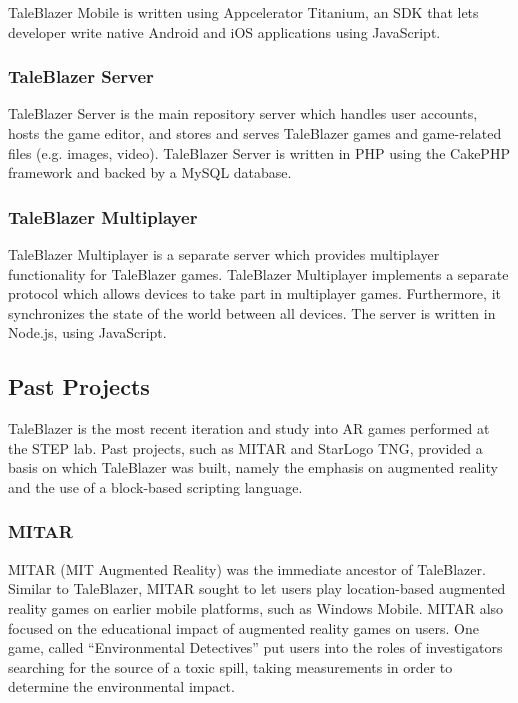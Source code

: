TaleBlazer Mobile is written using Appcelerator Titanium, an SDK that lets developer write native Android and iOS applications using JavaScript. 

\subsubsection{TaleBlazer Server}

TaleBlazer Server is the main repository server which handles user accounts, hosts the game editor, and stores and serves TaleBlazer games and game-related files (e.g. images, video). TaleBlazer Server is written in PHP using the CakePHP framework and backed by a MySQL database. 

\subsubsection{TaleBlazer Multiplayer}

TaleBlazer Multiplayer is a separate server which provides multiplayer functionality for TaleBlazer games. TaleBlazer Multiplayer implements a separate protocol which allows devices to take part in multiplayer games. Furthermore, it synchronizes the state of the world between all devices. The server is written in Node.js, using JavaScript.

\subsection{Past Projects}

TaleBlazer is the most recent iteration and study into AR games performed at the STEP lab. Past projects, such as MITAR and StarLogo TNG, provided a basis on which TaleBlazer was built, namely the emphasis on augmented reality and the use of a block-based scripting language.

\subsubsection{MITAR}

MITAR (MIT Augmented Reality) was the immediate ancestor of TaleBlazer. Similar to TaleBlazer, MITAR sought to let users play location-based augmented reality games on earlier mobile platforms, such as Windows Mobile. MITAR also focused on the educational impact of augmented reality games on users. One game, called ``Environmental Detectives'' put users into the roles of investigators searching for the source of a toxic spill, taking measurements in order to determine the environmental impact. \cite{site:ed}

